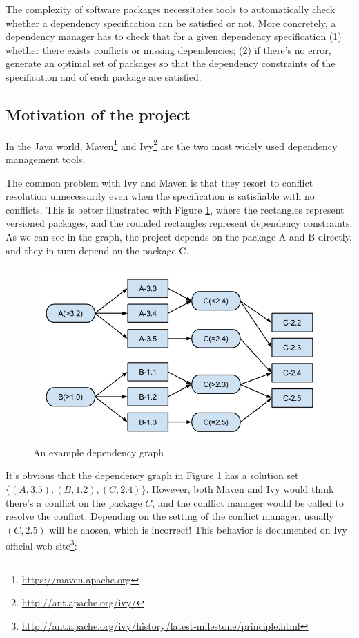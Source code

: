 The complexity of software packages necessitates tools to automatically check whether a dependency specification can be satisfied or not. More concretely, a dependency manager has to check that for a given dependency specification (1) whether there exists conflicts or missing dependencies; (2) if there's no error, generate an optimal set of packages so that the dependency constraints of the specification and of each package are satisfied.


\subsection{Motivation of the project}

In the Java world, Maven\footnote{\url{https://maven.apache.org}} and Ivy\footnote{\url{http://ant.apache.org/ivy/}} are the two most widely used dependency management tools.

The common problem with Ivy and Maven is that they resort to conflict resolution unnecessarily even when the specification is satisfiable with no conflicts. This is better illustrated with Figure \ref{fig:introuction:underconstraint}, where the rectangles represent versioned packages, and the rounded rectangles represent dependency constraints.  As we can see in the graph, the project depends on the package A and B directly, and they in turn depend on the package C.

\begin{figure}[ht]
  \center
  \includegraphics[width=14cm]{img/introduction/underconstraint.png}
  \caption[An example dependency graph]{An example dependency graph \label{fig:introuction:underconstraint}}
\end{figure}

It's obvious that the dependency graph in Figure \ref{fig:introuction:underconstraint} has a solution set $\{(A, 3.5), (B, 1.2), (C, 2.4)\}$. However, both Maven and Ivy would think there's a conflict on the package $C$, and the conflict manager would be called to resolve the conflict. Depending on the setting of the conflict manager, usually $(C, 2.5)$ will be chosen, which is incorrect! This behavior is documented on Ivy official web site\footnote{\url{http://ant.apache.org/ivy/history/latest-milestone/principle.html}}:

